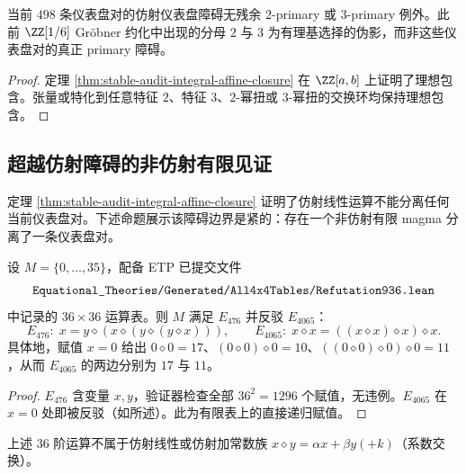 \documentclass[../../main.tex]{subfiles}
\begin{document}
\begin{corollary}[\(2/3\)-primary 闭合]\label{cor:stable-audit-primary-closure}
当前 \(498\) 条仪表盘对的仿射仪表盘障碍无残余 \(2\)-primary 或 \(3\)-primary 例外。此前 \(\ZZ[1/6]\) Gröbner 约化中出现的分母 \(2\) 与 \(3\) 为有理基选择的伪影，而非这些仪表盘对的真正 primary 障碍。
\end{corollary}

\begin{proof}
定理 \ref{thm:stable-audit-integral-affine-closure} 在 \(\ZZ[a,b]\) 上证明了理想包含。张量或特化到任意特征 \(2\)、特征 \(3\)、\(2\)-幂扭或 \(3\)-幂扭的交换环均保持理想包含。
\end{proof}

\subsection{超越仿射障碍的非仿射有限见证}

定理 \ref{thm:stable-audit-integral-affine-closure} 证明了仿射线性运算不能分离任何当前仪表盘对。下述命题展示该障碍边界是紧的：存在一个非仿射有限 magma 分离了一条仪表盘对。

\begin{proposition}[非仿射有限分离]\label{prop:stable-audit-non-affine-witness}
设 \(M=\{0,\ldots,35\}\)，配备 ETP 已提交文件
\[
    \texttt{\detokenize{Equational_Theories/Generated/All4x4Tables/Refutation936.lean}}
\]
中记录的 \(36\times 36\) 运算表。则 \(M\) 满足 \(E_{476}\) 并反驳 \(E_{4065}\)：
\[
    E_{476}:\; x=y\diamond(x\diamond(y\diamond(y\diamond x))),
    \qquad
    E_{4065}:\; x\diamond x=((x\diamond x)\diamond x)\diamond x.
\]
具体地，赋值 \(x=0\) 给出 \(0\diamond 0=17\)、\((0\diamond 0)\diamond 0=10\)、\(((0\diamond 0)\diamond 0)\diamond 0=11\)，从而 \(E_{4065}\) 的两边分别为 \(17\) 与 \(11\)。
\end{proposition}

\begin{proof}
\(E_{476}\) 含变量 \(x,y\)，验证器检查全部 \(36^2=1296\) 个赋值，无违例。\(E_{4065}\) 在 \(x=0\) 处即被反驳（如所述）。此为有限表上的直接递归赋值。
\end{proof}

\begin{proposition}[非仿射性证书]\label{prop:stable-audit-mediality-failure}
上述 \(36\) 阶运算不属于仿射线性或仿射加常数族 \(x\diamond y=\alpha x+\beta y(+k)\)（系数交换）。
\end{proposition}
\end{document}
